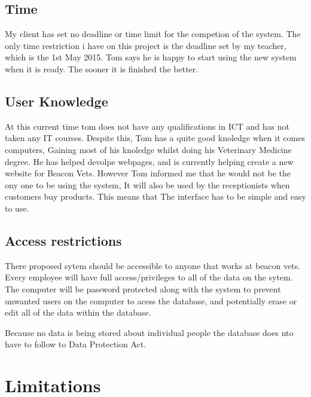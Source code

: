 \subsection{Time}

\begin{flushleft}
My client has set no deadline or time limit for the competion of the system. The only time restriction i have on this project is the deadline set by my teacher, which is the 1st May 2015. Tom says he is happy to start using the new system when it is ready. The sooner it is finished the better.
\end{flushleft}

\subsection{User Knowledge}

\begin{flushleft}
At this current time tom does not have any qualifications in ICT and has not taken any IT courses. Despite this, Tom has a quite good knoledge when it comes computers, Gaining most of his knoledge whilst doing his Veterinary Medicine degree. He has helped devolpe webpages, and is currently helping create a new website for Beacon Vets. However Tom informed me that he would not be the ony one to be using the system, It will also be used by the receptionists when customers buy products. This means that The interface has to be simple and easy to use.
\end{flushleft}

\subsection{Access restrictions}

\begin{flushleft}
There proposed sytem should be accessible to anyone that works at beacon vets. Every employee will have full access/privileges to all of the data on the sytem. The computer will be password protected along with the system to prevent unwanted users on the computer to acess the database, and potentially erase or edit all of the data within the database. \par
Because no data is being stored about individual people the database does nto have to follow to Data Protection Act.\par
\end{flushleft}

\section{Limitations}

